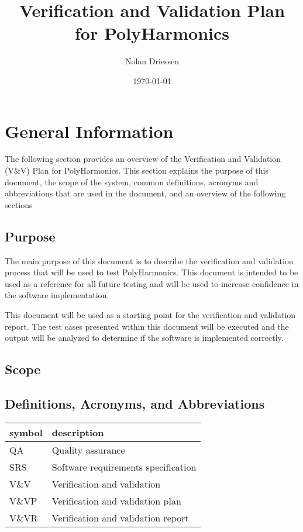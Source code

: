 \documentclass[12pt]{article}
\newcommand{\progname}{PolyHarmonics}
\begin{document}
\title{Verification and Validation Plan for \progname{}} 
\author{Nolan Driessen}
\date{\today}
	
\maketitle

\tableofcontents

%
%

\section{General Information}
The following section provides an overview of the Verification and Validation (V\&V) Plan 
for \progname{}. This section explains the purpose of this
document, the scope of the system, common definitions, acronyms and abbreviations that are used
in the document, and an overview of the following sections

\subsection{Purpose}
The main purpose of this document is to describe the verification and validation 
process that will be used to test \progname{}.
This document is intended to be used as a reference for all future testing and will
be used to increase confidence in the software implementation.  

This document will be used as a starting point for the verification and validation report. The 
test cases presented within this document will be executed and the output will be analyzed to 
determine if the software is implemented correctly.  


\subsection{Scope}


\subsection{Definitions, Acronyms, and Abbreviations }

\renewcommand{\arraystretch}{1.2}
\begin{tabular}{l l} 
  \toprule		
  \textbf{symbol} & \textbf{description}\\
  \midrule 
  QA		& Quality assurance\\
  SRS		& Software requirements specification\\
  V\&V		& Verification and validation\\
  V\&VP 	& Verification and validation plan\\
  V\&VR 	& Verification and validation report\\
  \bottomrule
\end{tabular}
\end{document}
